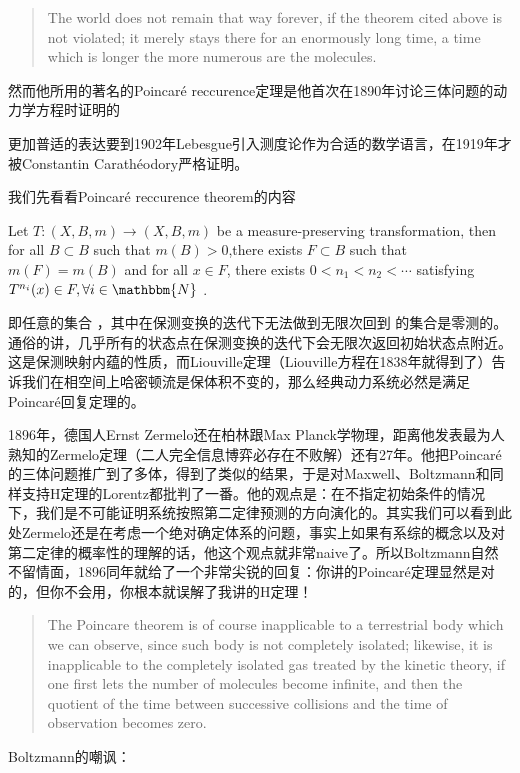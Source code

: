 \begin{quote}
	The world does not remain that way forever, if the theorem cited above is not violated; it merely stays there for an enormously long time, a time which is longer the more numerous are the molecules.
\end{quote}

然而他所用的著名的Poincaré reccurence定理是他首次在1890年讨论三体问题的动力学方程时证明的\cite{2}

更加普适的表达要到1902年Lebesgue引入测度论作为合适的数学语言，在1919年才被Constantin Carathéodory严格证明。

我们先看看Poincaré reccurence theorem的内容

Let $T:(X,B,m) \rightarrow (X,B,m)$ be a measure-preserving transformation, then for all $B \subset B$ such that $m(B)>0$,there exists  $F \subset B$ such that  $m(F)=m(B)$ and for all $x \in F$, there exists  $0<n_1<n_2<\cdots$ satisfying $T^{n_i }(x) \in F, \forall i \in \mathbbm{N}$ .


即任意的集合 ，其中在保测变换的迭代下无法做到无限次回到  的集合是零测的。通俗的讲，几乎所有的状态点在保测变换的迭代下会无限次返回初始状态点附近。这是保测映射内蕴的性质，而Liouville定理（Liouville方程在1838年就得到了）告诉我们在相空间上哈密顿流是保体积不变的，那么经典动力系统必然是满足Poincaré回复定理的。

1896年，德国人Ernst Zermelo还在柏林跟Max Planck学物理，距离他发表最为人熟知的Zermelo定理（二人完全信息博弈必存在不败解）还有27年。他把Poincaré的三体问题推广到了多体，得到了类似的结果，于是对Maxwell、Boltzmann和同样支持H定理的Lorentz都批判了一番。他的观点是：在不指定初始条件的情况下，我们是不可能证明系统按照第二定律预测的方向演化的。其实我们可以看到此处Zermelo还是在考虑一个绝对确定体系的问题，事实上如果有系综的概念以及对第二定律的概率性的理解的话，他这个观点就非常naive了。所以Boltzmann自然不留情面，1896同年就给了一个非常尖锐的回复：你讲的Poincaré定理显然是对的，但你不会用，你根本就误解了我讲的H定理！

\begin{quote}
	The Poincare theorem is of course inapplicable to a terrestrial body which we can observe, since such body is not completely isolated; likewise, it is inapplicable to the completely isolated gas treated by the kinetic theory, if one first lets the number of molecules become infinite, and then the quotient of the time between successive collisions and the time of observation becomes zero.
\end{quote}

Boltzmann的嘲讽：

